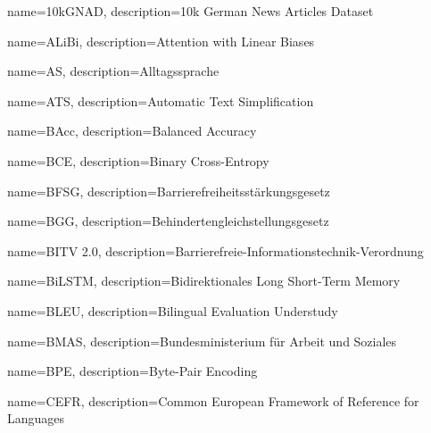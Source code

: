 \makeglossaries


{
    name={10kGNAD},
    description={10k German News Articles Dataset}
}

{
    name={ALiBi},
    description={Attention with Linear Biases}
}

{
    name={AS},
    description={Alltagssprache}
}

{
    name={ATS},
    description={Automatic Text Simplification}
}

{
    name={BAcc},
    description={Balanced Accuracy}
}

{
    name={BCE},
    description={Binary Cross-Entropy}
}

{
    name={BFSG},
    description={Barrierefreiheitsstärkungsgesetz}
}

{
    name={BGG},
    description={Behindertengleichstellungsgesetz}
}

{
    name={BITV 2.0},
    description={Barrierefreie-Informationstechnik-Verordnung}
}

{
    name={BiLSTM},
    description={Bidirektionales Long Short-Term Memory}
}

{
    name={BLEU},
    description={Bilingual Evaluation Understudy}
}

{
    name={BMAS},
    description={Bundesministerium für Arbeit und Soziales}
}

{
    name={BPE},
    description={Byte-Pair Encoding}
}

{
    name={CEFR},
    description={Common European Framework of Reference for Languages}
}

